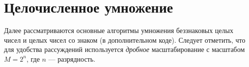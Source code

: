 \section{Целочисленное умножение}
\label{ch::div}

Далее рассматриваются основные алгоритмы умножения беззнаковых целых чисел и целых чисел со знаком (в дополнительном коде). Следует отметить, что для удобства рассуждений используется \emph{дробное} масштабирование с масштабом $M=2^n$, где $n$ --- разрядность. 








